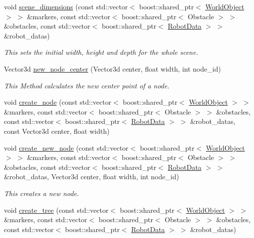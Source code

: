 \begin{CompactItemize}
\item 
void \hyperlink{class_octree_d09d7848f637b4322aa94f93217ef686}{scene\_\-dimensions} (const std::vector$<$ boost::shared\_\-ptr$<$ \hyperlink{class_world_object}{WorldObject} $>$ $>$ \&markers, const std::vector$<$ boost::shared\_\-ptr$<$ Obstacle $>$ $>$ \&obstacles, const std::vector$<$ boost::shared\_\-ptr$<$ \hyperlink{class_robot_data}{RobotData} $>$ $>$ \&robot\_\-datas)
\begin{CompactList}\small\item\em This sets the initial width, height and depth for the whole scene. \item\end{CompactList}\item 
Vector3d \hyperlink{class_octree_65c7cdf803bfb02dab9681ff6bc03520}{new\_\-node\_\-center} (Vector3d center, float width, int node\_\-id)
\begin{CompactList}\small\item\em This Method calculates the new center point of a node. \item\end{CompactList}\item 
void \hyperlink{class_octree_7eb807d724b4caa99d723d07c1d1f4a6}{create\_\-node} (const std::vector$<$ boost::shared\_\-ptr$<$ \hyperlink{class_world_object}{WorldObject} $>$ $>$ \&markers, const std::vector$<$ boost::shared\_\-ptr$<$ Obstacle $>$ $>$ \&obstacles, const std::vector$<$ boost::shared\_\-ptr$<$ \hyperlink{class_robot_data}{RobotData} $>$ $>$ \&robot\_\-datas, const Vector3d center, float width)
\item 
void \hyperlink{class_octree_a40e7b86db10838454cf39b3dc04e762}{create\_\-new\_\-node} (const std::vector$<$ boost::shared\_\-ptr$<$ \hyperlink{class_world_object}{WorldObject} $>$ $>$ \&markers, const std::vector$<$ boost::shared\_\-ptr$<$ Obstacle $>$ $>$ \&obstacles, const std::vector$<$ boost::shared\_\-ptr$<$ \hyperlink{class_robot_data}{RobotData} $>$ $>$ \&robot\_\-datas, Vector3d center, float width, int node\_\-id)
\begin{CompactList}\small\item\em This creates a new node. \item\end{CompactList}\item 
void \hyperlink{class_octree_2bb5bd9cce1feeebecd645f893647681}{create\_\-tree} (const std::vector$<$ boost::shared\_\-ptr$<$ \hyperlink{class_world_object}{WorldObject} $>$ $>$ \&markers, const std::vector$<$ boost::shared\_\-ptr$<$ Obstacle $>$ $>$ \&obstacles, const std::vector$<$ boost::shared\_\-ptr$<$ \hyperlink{class_robot_data}{RobotData} $>$ $>$ \&robot\_\-datas)

\end{CompactItemize}
